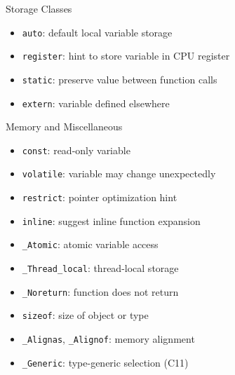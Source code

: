 \documentclass[12pt, aspectratio=169]{beamer}
\begin{document}
    \begin{frame}{Storage Classes}
        \begin{itemize}
            \item \texttt{auto}: default local variable storage
            \item \texttt{register}: hint to store variable in CPU register
            \item \texttt{static}: preserve value between function calls
            \item \texttt{extern}: variable defined elsewhere
        \end{itemize}
    \end{frame}


    \begin{frame}{Memory and Miscellaneous}
        \begin{itemize}
            \item \texttt{const}: read-only variable
            \item \texttt{volatile}: variable may change unexpectedly
            \item \texttt{restrict}: pointer optimization hint
            \item \texttt{inline}: suggest inline function expansion
            \item \texttt{\_Atomic}: atomic variable access
            \item \texttt{\_Thread\_local}: thread-local storage
            \item \texttt{\_Noreturn}: function does not return
            \item \texttt{sizeof}: size of object or type
            \item \texttt{\_Alignas}, \texttt{\_Alignof}: memory alignment
            \item \texttt{\_Generic}: type-generic selection (C11)
        \end{itemize}
    \end{frame}
\end{document}
